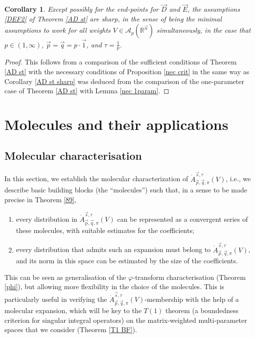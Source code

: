 \documentclass[11pt, reqno]{amsart}
\newtheorem{corollary}[theorem]{Corollary}
\theoremstyle{definition}
\theoremstyle{remark}
\numberwithin{equation}{section}
\newcommand{\A}{\mathscr A}
\newcommand{\vD}{\vec D}
\newcommand{\vE}{\vec E}
\newcommand{\R}{\mathbb R}
\newcommand{\vone}{\vec 1}
\newcommand{\vn}{\vec n}
\newcommand{\vp}{\vec p}
\newcommand{\vq}{\vec q}
\newcommand{\vs}{\vec s}
\newcommand{\Atau}{\dot A^{\vs,\tau}_{\vp,\vq,\pi}}
\begin{document}
\begin{corollary}\label{AD st sharp2}
Except possibly for the end-points for $\vD$ and $\vE$, the assumptions \eqref{DEF2} of Theorem \ref{AD st} are sharp, in the sense of being the minimal assumptions to work for all weights $V\in\A_p(\R^{\vn})$  simultaneously, in the case that $p\in(1,\infty)$, $\vp=\vq=p\cdot\vone$, and $\tau=\frac1p$.
\end{corollary}

\begin{proof}
This follows from a comparison of the sufficient conditions of Theorem \ref{AD st} with the necessary conditions of Proposition \ref{nec crit} in the same way as Corollary \ref{AD st sharp} was deduced from the comparison of the one-parameter case of Theorem \ref{AD st} with Lemma \ref{nec 1param}.
\end{proof}

\section{Molecules and their applications}\label{sec:molecules}

\subsection{Molecular characterisation}\label{sec mp}

In this section, we establish the molecular characterization of $\Atau(V)$, i.e., we describe basic building blocks (the ``molecules'') such that, in a sense to be made precise in Theorem \ref{89},
\begin{enumerate}[\rm(1)]
  \item\label{it:analysis} every distribution in $\Atau(V)$ can be represented as a convergent series of these molecules, with suitable estimates for the coefficients;
  \item\label{it:synthesis} every distribution that admits such an expansion must belong to $\Atau(V)$, and its norm in this space can be estimated by the size of the coefficients.
\end{enumerate}
This can be seen as generalisation of the $\varphi$-transform characterisation (Theorem \ref{phi}), but allowing more flexibility in the choice of the molecules. This is particularly useful in verifying the $\Atau(V)$-membership with the help of a molecular expansion, which will be key to the $T(1)$ theorem (a boundedness criterion for singular integral operators) on the matrix-weighted multi-parameter spaces that we consider (Theorem \ref{T1 BF}).
\end{document}
